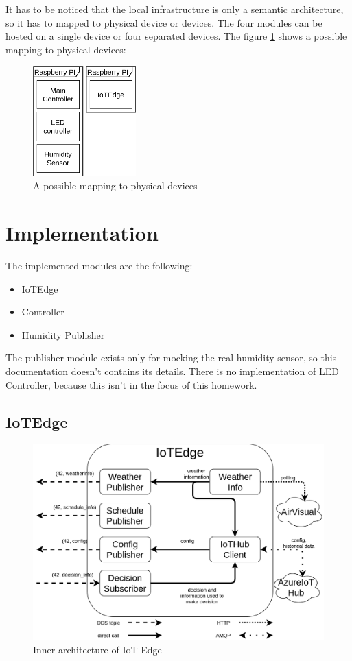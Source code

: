 \documentclass{article}
\begin{document}
It has to be noticed that the local infrastructure is only a semantic architecture, so it has to mapped to physical device or devices. The four modules can be hosted on a single device or four separated devices. The figure \ref{fig:phisical_mapping} shows a possible mapping to physical devices:
\begin{figure}[!htb]
\centering
  \includegraphics[width=150px]{imgs/phisical_mapping.png}
  \caption{A possible mapping to physical devices}
  \label{fig:phisical_mapping}
\end{figure}


\section{Implementation}
The implemented modules are the following:
\begin{itemize}
\item IoTEdge
\item Controller
\item Humidity Publisher
\end{itemize}
The publisher module exists only for mocking the real humidity sensor, so this documentation doesn't contains its details. There is no implementation of LED Controller, because this isn't in the focus of this homework.
\subsection{IoTEdge}
\begin{figure}[!htb]
  \includegraphics[width=\linewidth]{imgs/edge.png}
  \caption{Inner architecture of IoT Edge}
  \label{fig:arc_edge}
\end{figure}
\end{document}
